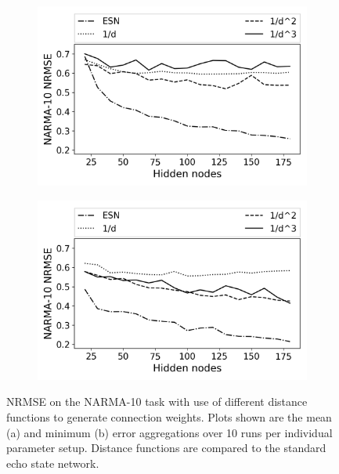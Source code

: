 \begin{figure}[t]
  \centering
  \begin{subfigure}{.49\textwidth}
    \centering
    \includegraphics[width=1.0\linewidth]{figures/RGG-dist-performance-mean.png}
    \caption{}
    \label{fig:dist-performance-a}
  \end{subfigure}
  \begin{subfigure}{.49\textwidth}
    \centering
    \includegraphics[width=1.0\linewidth]{figures/RGG-dist-performance-min.png}
    \caption{}
    \label{fig:dist-performance-b}
  \end{subfigure}
  \caption{
    NRMSE on the NARMA-10 task with use of different distance functions to
generate connection weights. Plots shown are the mean (a) and minimum (b) error
aggregations over 10 runs per individual parameter setup. Distance functions are
compared to the standard echo state network.
  }
  \label{fig:dist-performance}
\end{figure}

